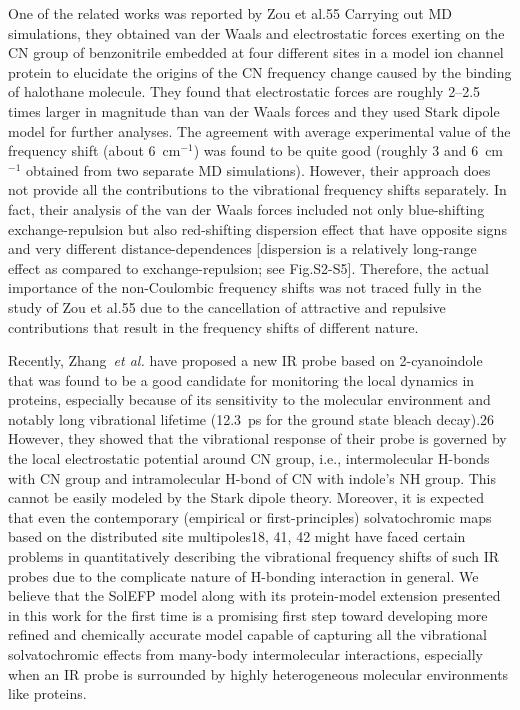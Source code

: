 \documentclass[a4paper,titlepage,twoside,fleqn,12pt]{book}
\begin{document}
\begin{refsection}
One of the related works was reported by Zou et al.55 Carrying
out MD simulations, they obtained van der Waals and
electrostatic forces exerting on the CN group of benzonitrile
embedded at four different sites in a model ion channel
protein to elucidate the origins of the CN frequency change
caused by the binding of halothane molecule. They found that
electrostatic forces are roughly 2--2.5 times larger in magnitude
than van der Waals forces and they used Stark dipole model
for further analyses. The agreement with average
experimental value of the frequency shift (about 6~cm$^{-1}$) was
found to be quite good (roughly 3 and 6~cm$^{-1}$ obtained from
two separate MD simulations). However, their approach does
not provide all the contributions to the vibrational frequency
shifts separately. In fact, their analysis of the van der Waals
forces included not only blue\hyp{}shifting exchange\hyp{}repulsion but
also red\hyp{}shifting dispersion effect that have opposite signs and
very different distance\hyp{}dependences [dispersion is a relatively
long\hyp{}range effect as compared to exchange\hyp{}repulsion; see
Fig.S2-S5]. Therefore, the actual importance of the non\hyp{}Coulombic 
frequency shifts was not traced fully in the study of
Zou et al.55 due to the cancellation of attractive and repulsive
contributions that result in the frequency shifts of different
nature.

Recently, Zhang~\emph{et al.} have proposed a new IR probe based on
2-cyanoindole that was found to be a good candidate for
monitoring the local dynamics in proteins, especially because
of its sensitivity to the molecular environment and notably
long vibrational lifetime (12.3~ps for the ground state bleach
decay).26 However, they showed that the vibrational response
of their probe is governed by the local electrostatic potential
around CN group, i.e., intermolecular H-bonds with CN group
and intramolecular H-bond of CN with indole's NH group. This
cannot be easily modeled by the Stark dipole theory.
Moreover, it is expected that even the contemporary
(empirical or first\hyp{}principles) solvatochromic maps based on
the distributed site multipoles18, 41, 42 might have faced certain
problems in quantitatively describing the vibrational frequency
shifts of such IR probes due to the complicate nature of H-bonding
interaction in general. We believe that the SolEFP
model along with its protein\hyp{}model extension presented in this
work for the first time is a promising first step toward
developing more refined and chemically accurate model
capable of capturing all the vibrational solvatochromic effects
from many\hyp{}body intermolecular interactions, especially when
an IR probe is surrounded by highly heterogeneous molecular
environments like proteins.



\end{refsection}
\end{document}
